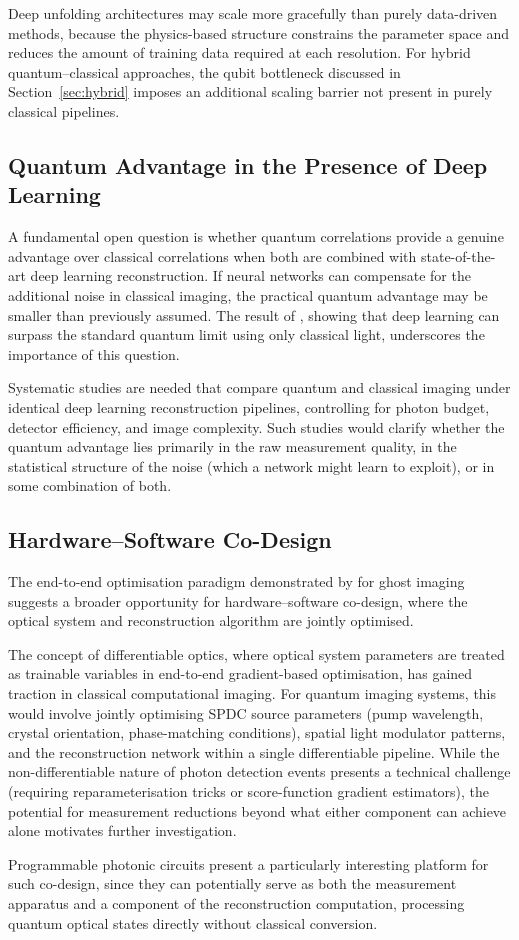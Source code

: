 Deep unfolding architectures \citep{monga2021} may scale more gracefully than purely data-driven methods, because the physics-based structure constrains the parameter space and reduces the amount of training data required at each resolution. For hybrid quantum--classical approaches, the qubit bottleneck discussed in Section~\ref{sec:hybrid} imposes an additional scaling barrier not present in purely classical pipelines.

\subsection{Quantum Advantage in the Presence of Deep Learning}

A fundamental open question is whether quantum correlations provide a genuine advantage over classical correlations when both are combined with state-of-the-art deep learning reconstruction. If neural networks can compensate for the additional noise in classical imaging, the practical quantum advantage may be smaller than previously assumed. The result of \citet{cai2023}, showing that deep learning can surpass the standard quantum limit using only classical light, underscores the importance of this question.

Systematic studies are needed that compare quantum and classical imaging under identical deep learning reconstruction pipelines, controlling for photon budget, detector efficiency, and image complexity. Such studies would clarify whether the quantum advantage lies primarily in the raw measurement quality, in the statistical structure of the noise (which a network might learn to exploit), or in some combination of both.

\subsection{Hardware--Software Co-Design}

The end-to-end optimisation paradigm demonstrated by \citet{wang2019} for ghost imaging suggests a broader opportunity for hardware--software co-design, where the optical system and reconstruction algorithm are jointly optimised.

The concept of differentiable optics, where optical system parameters are treated as trainable variables in end-to-end gradient-based optimisation, has gained traction in classical computational imaging. For quantum imaging systems, this would involve jointly optimising SPDC source parameters (pump wavelength, crystal orientation, phase-matching conditions), spatial light modulator patterns, and the reconstruction network within a single differentiable pipeline. While the non-differentiable nature of photon detection events presents a technical challenge (requiring reparameterisation tricks or score-function gradient estimators), the potential for measurement reductions beyond what either component can achieve alone motivates further investigation.

Programmable photonic circuits present a particularly interesting platform for such co-design, since they can potentially serve as both the measurement apparatus and a component of the reconstruction computation, processing quantum optical states directly without classical conversion.
